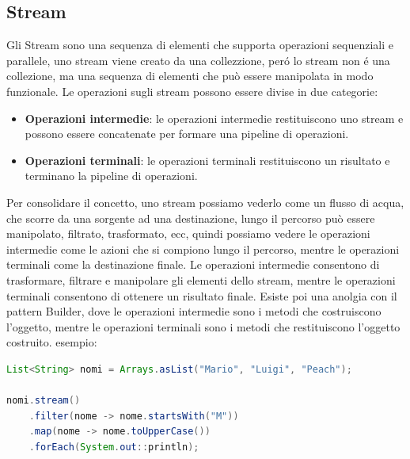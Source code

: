 \documentclass[11pt]{article}
\begin{document}
\subsection{Stream}
Gli Stream sono una sequenza di elementi che supporta operazioni sequenziali e parallele, uno stream viene creato da una collezzione, peró lo stream non é una collezione, ma una sequenza di elementi che può essere manipolata in modo funzionale.
Le operazioni sugli stream possono essere divise in due categorie:
\begin{itemize}
    \item \textbf{Operazioni intermedie}: le operazioni intermedie restituiscono uno stream e possono essere concatenate per formare una pipeline di operazioni.
    \item \textbf{Operazioni terminali}: le operazioni terminali restituiscono un risultato e terminano la pipeline di operazioni.
    \end{itemize}
Per consolidare il concetto, uno stream possiamo vederlo come un flusso di acqua, che scorre da una sorgente ad una destinazione, lungo il percorso può essere manipolato, filtrato, trasformato, ecc, quindi possiamo vedere le operazioni intermedie come le azioni che si compiono lungo il percorso, mentre le operazioni terminali come la destinazione finale.
Le operazioni intermedie consentono di trasformare, filtrare e manipolare gli elementi dello stream, mentre le operazioni terminali consentono di ottenere un risultato finale.
Esiste poi una anolgia con il pattern Builder, dove le operazioni intermedie sono i metodi che costruiscono l'oggetto, mentre le operazioni terminali sono i metodi che restituiscono l'oggetto costruito.
\newline
esempio:
\begin{lstlisting}[language=Java]
List<String> nomi = Arrays.asList("Mario", "Luigi", "Peach");

nomi.stream()
    .filter(nome -> nome.startsWith("M"))
    .map(nome -> nome.toUpperCase())
    .forEach(System.out::println);
\end{lstlisting}
\end{document}
